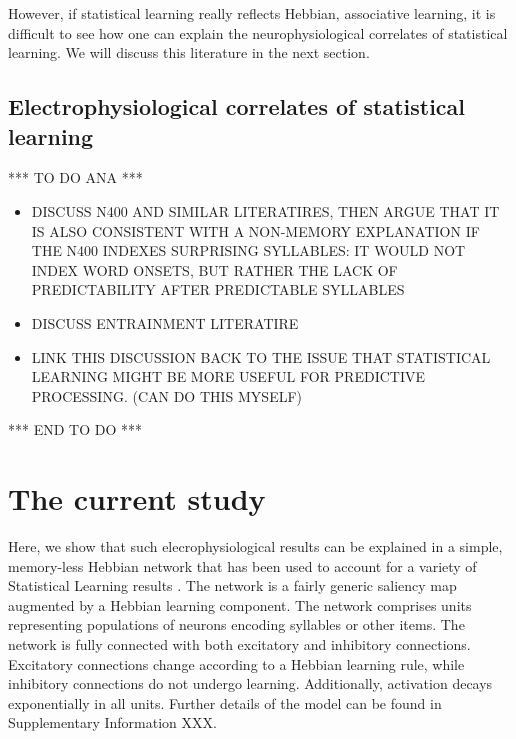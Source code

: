 \documentclass[
]{article}
\providecommand{\tightlist}{%
  \setlength{\itemsep}{0pt}\setlength{\parskip}{0pt}}
\begin{document}
However, if statistical learning really reflects Hebbian, associative
learning, it is difficult to see how one can explain the
neurophysiological correlates of statistical learning. We will discuss
this literature in the next section.

\hypertarget{electrophysiological-correlates-of-statistical-learning}{%
\subsection{Electrophysiological correlates of statistical
learning}\label{electrophysiological-correlates-of-statistical-learning}}

*** TO DO ANA ***

\citep{Batterink2017, Buiatti2009, Flo2022, Kabdebon2015, Moser2021}

\begin{itemize}
\tightlist
\item
  DISCUSS N400 AND SIMILAR LITERATIRES, THEN ARGUE THAT IT IS ALSO
  CONSISTENT WITH A NON-MEMORY EXPLANATION IF THE N400 INDEXES
  SURPRISING SYLLABLES: IT WOULD NOT INDEX WORD ONSETS, BUT RATHER THE
  LACK OF PREDICTABILITY AFTER PREDICTABLE SYLLABLES
\item
  DISCUSS ENTRAINMENT LITERATIRE
\item
  LINK THIS DISCUSSION BACK TO THE ISSUE THAT STATISTICAL LEARNING MIGHT
  BE MORE USEFUL FOR PREDICTIVE PROCESSING. (CAN DO THIS MYSELF)
\end{itemize}

*** END TO DO ***

\hypertarget{the-current-study}{%
\section{The current study}\label{the-current-study}}

Here, we show that such elecrophysiological results can be explained in
a simple, memory-less Hebbian network that has been used to account for
a variety of Statistical Learning results \citep{Endress-TP-Model}. The
network is a fairly generic saliency map
\citep{Bays2010, Endress-Catastrophic-Interference, Gottlieb2007, Roggeman2010, Sengupta2014}
augmented by a Hebbian learning component. The network comprises units
representing populations of neurons encoding syllables or other items.
The network is fully connected with both excitatory and inhibitory
connections. Excitatory connections change according to a Hebbian
learning rule, while inhibitory connections do not undergo learning.
Additionally, activation decays exponentially in all units. Further
details of the model can be found in Supplementary Information XXX.
\end{document}
